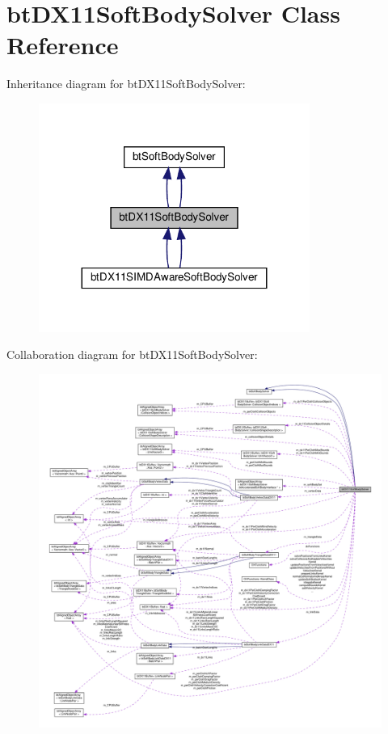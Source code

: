 \hypertarget{classbtDX11SoftBodySolver}{}\section{bt\+D\+X11\+Soft\+Body\+Solver Class Reference}
\label{classbtDX11SoftBodySolver}


Inheritance diagram for bt\+D\+X11\+Soft\+Body\+Solver\+:
\nopagebreak
\begin{figure}[H]
\begin{center}
\leavevmode
\includegraphics[width=251pt]{classbtDX11SoftBodySolver__inherit__graph}
\end{center}
\end{figure}


Collaboration diagram for bt\+D\+X11\+Soft\+Body\+Solver\+:
\nopagebreak
\begin{figure}[H]
\begin{center}
\leavevmode
\includegraphics[width=350pt]{classbtDX11SoftBodySolver__coll__graph}
\end{center}
\end{figure}
